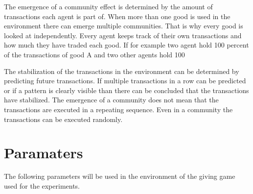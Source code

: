 \documentclass[twoside,openright]{uva-bachelor-thesis}
\begin{document}
The emergence of a community effect is determined by the amount of transactions each agent is part of. When more than one good is used in the environment there can emerge multiple communities. That is why every good is looked at independently. Every agent keeps track of their own transactions and how much they have traded each good. If for example two agent hold 100 percent of the transactions of good A and two other agents hold 100%

The stabilization of the transactions in the environment can be determined by predicting future transactions. If multiple transactions in a row can be predicted or if a pattern is clearly visible than there can be concluded that the transactions have stabilized. The emergence of a community does not mean that the transactions are executed in a repeating sequence. Even in a community the transactions can be executed randomly.


\section{Paramaters}
The following parameters will be used in the environment of the giving game used for the experiments.
\end{document}
